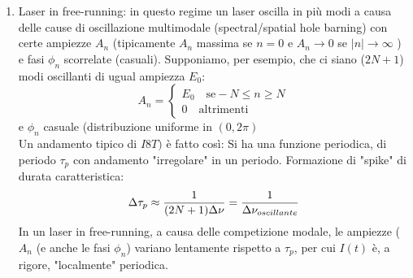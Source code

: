 \begin{enumerate}
\item Laser in free-running: in questo regime un laser oscilla in più modi a causa delle cause di oscillazione multimodale (spectral/spatial hole barning) con certe ampiezze $A_n$ (tipicamente $A_n$ massima se $n=0$ e $A_n\rightarrow 0$ se $|n| \rightarrow \infty$ ) e fasi $\phi_n$ scorrelate (casuali). Supponiamo, per esempio, che ci siano ($2N+1$) modi oscillanti di ugual ampiezza $E_0$:
\begin{equation*}
A_n = \begin{cases}
E_0 \quad \text{se} -N\leq n \geq N\\
0 \quad \text{altrimenti}
\end{cases}
\end{equation*}
e $\phi_n$ casuale (distribuzione uniforme in $(0, 2\pi)$\\
Un andamento tipico di $I8T)$ è fatto così:
Si ha una funzione periodica, di periodo $\tau_p$ con andamento "irregolare" in un periodo.
Formazione di "spike" di durata caratteristica:
\begin{equation*}
\Delta\tau_p \approx \frac{1}{(2N+1)\Delta\nu} = \frac{1}{\Delta\nu_{oscillante}}
\end{equation*}
In un laser in free-running, a causa delle competizione modale, le ampiezze ($A_n$ (e anche le fasi $\phi_n$) variano lentamente rispetto a $\tau_p$, per cui $I(t)$ è, a rigore, "localmente" periodica.


\end{enumerate}

